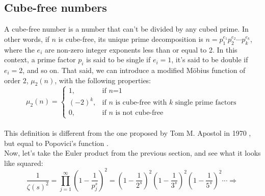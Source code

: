 \documentclass[12pt]{article}
\newcommand*{\citesup}[1]{%
\begingroup
\color{Green}
\cite{#1}%
\endgroup
\ignorespacesafterend
}
\begin{document}
\subsection{Cube-free numbers} \label{Proof2}
A cube-free number is a number that can't be divided by any cubed prime. In other words, if $n$ is cube-free, its unique prime decomposition is $n=p_{1}^{e_{1}}p_{2}^{e_{2}}\cdots p_{k}^{e_{k}}$, where the $e_{i}$ are non-zero integer exponents less than or equal to 2. In this context, a prime factor $p_{i}$ is said to be single if $e_{i}=1$, it's said to be double if $e_{i}=2$, and so on. That said, we can introduce a modified M\"{o}bius function of order $2$, $\mu_{2}(n)$, with the following properties:
\begin{equation}
\mu_{2}(n)=\begin{cases} \nonumber
    1, & \text{if $n$=1}\\
    (-2)^{k}, & \text{if $n$ is cube-free with $k$ single prime factors}\\
    0, & \text{if $n$ is not cube-free} 
  \end{cases}
\end{equation}\\
\indent This definition is different from the one proposed by Tom M. Apostol in 1970\citesup{Apostol}, but equal to Popovici's function\citesup{Popovici}.\\
\indent Now, let's take the Euler product from the previous section, and see what it looks like squared:
\begin{equation} \label{eq:euler_prod^2} \nonumber
\frac{1}{\zeta(s)^2}=\prod_{j=1}^{\infty}\left(1-\frac{1}{p_{j}^{s}}\right)^2=\left(1-\frac{1}{2^{s}}\right)^2\left(1-\frac{1}{3^{s}}\right)^2\left(1-\frac{1}{5^{s}}\right)^2\cdots \Rightarrow
\end{equation}
\end{document}
